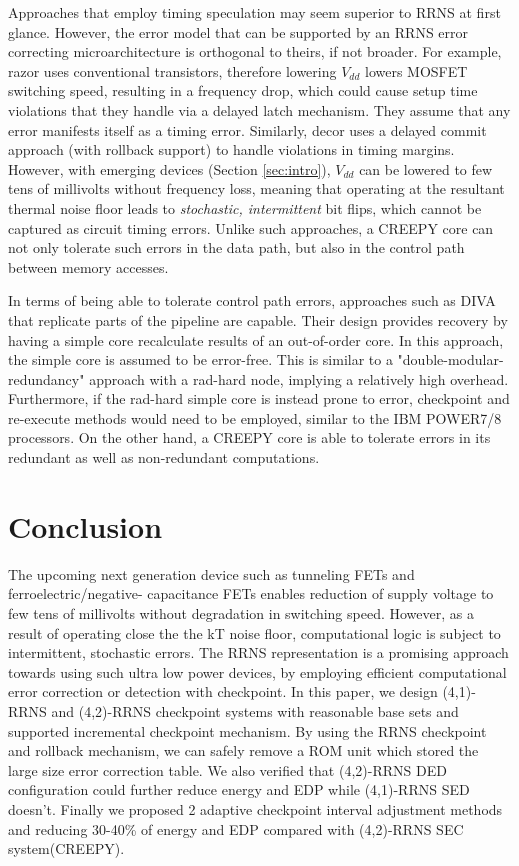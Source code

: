 \documentclass{sig-alternate}
\begin{document}
Approaches that employ timing speculation\cite{razor_2003,decor_2008} may seem superior to RRNS at first glance. However, the error model that can be supported by an RRNS error correcting microarchitecture is orthogonal to theirs, if not broader. For example, razor\cite{razor_2003} uses conventional transistors, therefore lowering $V_{dd}$ lowers MOSFET switching speed, resulting in a frequency drop, which could cause setup time violations that they handle via a delayed latch mechanism. They assume that any error manifests itself as a timing error. Similarly, decor\cite{decor_2008} uses a delayed commit approach (with rollback support) to handle violations in timing margins. However, with emerging devices (Section \ref{sec:intro}), $V_{dd}$ can be lowered to few tens of millivolts without frequency loss, meaning that operating at the resultant thermal noise floor leads to \textit{stochastic, intermittent} bit flips, which cannot be captured as circuit timing errors. Unlike such approaches, a CREEPY core can not only tolerate such errors in the data path, but also in the control path between memory accesses.

In terms of being able to tolerate control path errors, approaches such as DIVA\cite{DIVA} that replicate parts of the pipeline are capable. Their design provides recovery by having a simple core recalculate results of an out-of-order core. In this approach, the simple core is assumed to be error-free.  This is similar to a "double-modular-redundancy" approach with a rad-hard node, implying a relatively high overhead. Furthermore, if the rad-hard simple core is instead prone to error, checkpoint and re-execute methods would need to be employed, similar to the IBM POWER7/8 processors\cite{ibmpower8}. On the other hand, a CREEPY core is able to tolerate errors in its redundant as well as non-redundant computations.

\section{Conclusion}
The upcoming next generation device such as tunneling FETs and ferroelectric/negative- capacitance FETs enables reduction of supply voltage to few tens of millivolts without degradation in switching speed. However, as a result of operating close the the kT noise  floor, computational logic is subject to intermittent, stochastic errors.  The RRNS representation is a promising approach towards using such ultra low power devices, by employing efficient computational error correction or detection with checkpoint.
In this paper, we design (4,1)-RRNS and (4,2)-RRNS checkpoint systems with reasonable base sets and supported incremental checkpoint mechanism. By using the RRNS checkpoint and rollback mechanism, we can safely remove a ROM unit which stored the large size error correction table. We also verified that (4,2)-RRNS DED configuration could further reduce energy and EDP while (4,1)-RRNS SED doesn't. Finally we proposed 2 adaptive checkpoint interval adjustment methods and reducing 30-40\% of energy and EDP compared with (4,2)-RRNS SEC system(CREEPY). 
\end{document}
